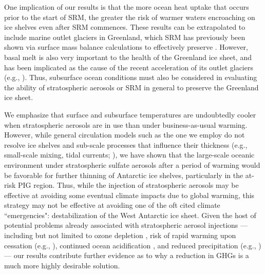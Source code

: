 \documentclass[draft,grl]{AGUTeX}  %
\begin{document}
\begin{article}

One implication of our results is that the more ocean heat uptake that occurs prior to the start of SRM, the greater the risk of warmer waters encroaching on ice shelves even after SRM commences. These results can be extrapolated to include marine outlet glaciers in Greenland, which SRM has previously been shown via surface mass balance calculations to effectively preserve \citep{irvine09}. However, basal melt is also very important to the health of the Greenland ice sheet, and has been implicated as the cause of the recent acceleration of its outlet glaciers (e.g., \cite{dholland08}). Thus, subsurface ocean conditions must also be considered in evaluating the ability of stratospheric aerosols or SRM in general to preserve the Greenland ice sheet.

We emphasize that surface and subsurface temperatures are undoubtedly cooler when stratospheric aerosols are in use than under business-as-usual warming. However, while general circulation models such as the one we employ do not resolve ice shelves and sub-scale processes that influence their thickness (e.g., small-scale mixing, tidal currents; \cite{joughin11}), we have shown that the large-scale oceanic environment under stratospheric sulfate aerosols after a period of warming would be favorable for further thinning of Antarctic ice shelves, particularly in the at-risk PIG region. Thus, while the injection of stratospheric aerosols may be effective at avoiding some eventual climate impacts due to global warming, this strategy may not be effective at avoiding one of the oft cited climate ``emergencies": destabilization of the West Antarctic ice sheet. Given the host of potential problems already associated with stratospheric aerosol injections --- including but not limited to ozone depletion \citep{tilmes08,heckendorn09}, risk of rapid warming upon cessation (e.g., \cite{mccusker14}), continued ocean acidification \citep{feely04}, and reduced precipitation (e.g., \cite{bala08}) --- our results contribute further evidence as to why a reduction in GHGs is a much more highly desirable solution. %





\end{article}
\end{document}
